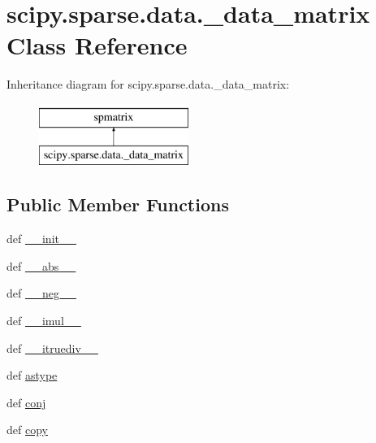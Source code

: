 \hypertarget{classscipy_1_1sparse_1_1data_1_1__data__matrix}{}\section{scipy.\+sparse.\+data.\+\_\+data\+\_\+matrix Class Reference}
\label{classscipy_1_1sparse_1_1data_1_1__data__matrix}
Inheritance diagram for scipy.\+sparse.\+data.\+\_\+data\+\_\+matrix\+:\begin{figure}[H]
\begin{center}
\leavevmode
\includegraphics[height=2.000000cm]{classscipy_1_1sparse_1_1data_1_1__data__matrix}
\end{center}
\end{figure}
\subsection*{Public Member Functions}
\begin{DoxyCompactItemize}
\item 
def \hyperlink{classscipy_1_1sparse_1_1data_1_1__data__matrix_a21fd967759bb4e90684f013f10e6e89b}{\+\_\+\+\_\+init\+\_\+\+\_\+}
\item 
def \hyperlink{classscipy_1_1sparse_1_1data_1_1__data__matrix_a2dc8fd93eb104e1c0453972617f8704e}{\+\_\+\+\_\+abs\+\_\+\+\_\+}
\item 
def \hyperlink{classscipy_1_1sparse_1_1data_1_1__data__matrix_a34c8bc431af61fa890f6431afc36d74a}{\+\_\+\+\_\+neg\+\_\+\+\_\+}
\item 
def \hyperlink{classscipy_1_1sparse_1_1data_1_1__data__matrix_a186c2563455140c5439c4bd7d582c11f}{\+\_\+\+\_\+imul\+\_\+\+\_\+}
\item 
def \hyperlink{classscipy_1_1sparse_1_1data_1_1__data__matrix_af9c93d395fbceb1ec49c0098bfdfc452}{\+\_\+\+\_\+itruediv\+\_\+\+\_\+}
\item 
def \hyperlink{classscipy_1_1sparse_1_1data_1_1__data__matrix_aa05337ba7b62552f436432df768f0ab6}{astype}
\item 
def \hyperlink{classscipy_1_1sparse_1_1data_1_1__data__matrix_a5f5ff4cb0c4097e24a8ea2df51078a1e}{conj}
\item 
def \hyperlink{classscipy_1_1sparse_1_1data_1_1__data__matrix_a2963f8d35016ac40eb200bd73a3b032a}{copy}
\end{DoxyCompactItemize}
